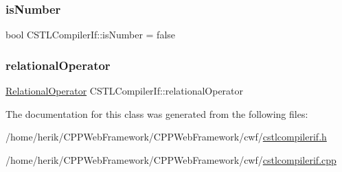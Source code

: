 \mbox{\label{class_c_s_t_l_compiler_if_a598f5f0e824ffa6a6b817a362e108363}} 
\subsubsection{\texorpdfstring{is\+Number}{isNumber}}
{\footnotesize\ttfamily bool C\+S\+T\+L\+Compiler\+If\+::is\+Number = false}

\mbox{\label{class_c_s_t_l_compiler_if_a62b146cf929d1281be7a4d280bff04df}} 
\subsubsection{\texorpdfstring{relational\+Operator}{relationalOperator}}
{\footnotesize\ttfamily \hyperlink{cstlcompilerif_8h_ab4e50941dad07890a1fdde098016b6d8}{Relational\+Operator} C\+S\+T\+L\+Compiler\+If\+::relational\+Operator}



The documentation for this class was generated from the following files\+:\begin{DoxyCompactItemize}
\item 
/home/herik/\+C\+P\+P\+Web\+Framework/\+C\+P\+P\+Web\+Framework/cwf/\hyperlink{cstlcompilerif_8h}{cstlcompilerif.\+h}\item 
/home/herik/\+C\+P\+P\+Web\+Framework/\+C\+P\+P\+Web\+Framework/cwf/\hyperlink{cstlcompilerif_8cpp}{cstlcompilerif.\+cpp}\end{DoxyCompactItemize}
